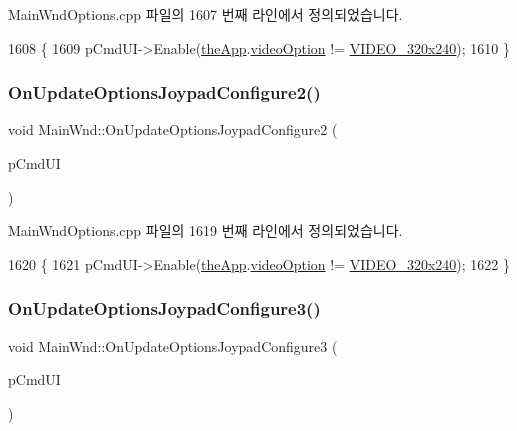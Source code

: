 Main\+Wnd\+Options.\+cpp 파일의 1607 번째 라인에서 정의되었습니다.


\begin{DoxyCode}
1608 \{
1609   pCmdUI->Enable(\mbox{\hyperlink{_v_b_a_8cpp_a8095a9d06b37a7efe3723f3218ad8fb3}{theApp}}.\mbox{\hyperlink{class_v_b_a_a17dac073149c897f770c00ed7098ad32}{videoOption}} != \mbox{\hyperlink{_v_b_a_8h_a531c35e38ede3ea4e5ba5afb24b29493a658665cfbdbd908bdb77babe125d0341}{VIDEO\_320x240}});
1610 \}
\end{DoxyCode}
\mbox{\label{class_main_wnd_aab2ac316b4151d3235065ddb6fae1c42}} 
\subsubsection{\texorpdfstring{On\+Update\+Options\+Joypad\+Configure2()}{OnUpdateOptionsJoypadConfigure2()}}
{\footnotesize\ttfamily void Main\+Wnd\+::\+On\+Update\+Options\+Joypad\+Configure2 (\begin{DoxyParamCaption}\item[{C\+Cmd\+UI $\ast$}]{p\+Cmd\+UI }\end{DoxyParamCaption})\hspace{0.3cm}{\ttfamily [protected]}}



Main\+Wnd\+Options.\+cpp 파일의 1619 번째 라인에서 정의되었습니다.


\begin{DoxyCode}
1620 \{
1621   pCmdUI->Enable(\mbox{\hyperlink{_v_b_a_8cpp_a8095a9d06b37a7efe3723f3218ad8fb3}{theApp}}.\mbox{\hyperlink{class_v_b_a_a17dac073149c897f770c00ed7098ad32}{videoOption}} != \mbox{\hyperlink{_v_b_a_8h_a531c35e38ede3ea4e5ba5afb24b29493a658665cfbdbd908bdb77babe125d0341}{VIDEO\_320x240}});
1622 \}
\end{DoxyCode}
\mbox{\label{class_main_wnd_adce78783951780ef126850460c0d058e}} 
\subsubsection{\texorpdfstring{On\+Update\+Options\+Joypad\+Configure3()}{OnUpdateOptionsJoypadConfigure3()}}
{\footnotesize\ttfamily void Main\+Wnd\+::\+On\+Update\+Options\+Joypad\+Configure3 (\begin{DoxyParamCaption}\item[{C\+Cmd\+UI $\ast$}]{p\+Cmd\+UI }\end{DoxyParamCaption})\hspace{0.3cm}{\ttfamily [protected]}}



